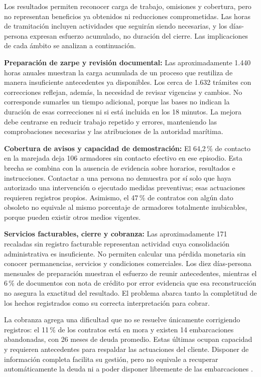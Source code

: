 Los resultados permiten reconocer carga de trabajo, omisiones y cobertura, pero no representan beneficios ya obtenidos ni reducciones comprometidas. Las horas de tramitación incluyen actividades que seguirán siendo necesarias, y los días-persona expresan esfuerzo acumulado, no duración del cierre. Las implicaciones de cada ámbito se analizan a continuación.

\textbf{Preparación de zarpe y revisión documental:}
Las aproximadamente 1.440 horas anuales muestran la carga acumulada de un proceso que reutiliza de manera insuficiente antecedentes ya disponibles. Los cerca de 1.632 trámites con correcciones reflejan, además, la necesidad de revisar vigencias y cambios. No corresponde sumarles un tiempo adicional, porque las bases no indican la duración de esas correcciones ni si está incluida en los 18 minutos. La mejora debe centrarse en reducir trabajo repetido y errores, manteniendo las comprobaciones necesarias y las atribuciones de la autoridad marítima.

\textbf{Cobertura de avisos y capacidad de demostración:} El 64,2\,\% de contacto en la marejada deja 106 armadores sin contacto efectivo en ese episodio. Esta brecha se combina con la ausencia de evidencia sobre horarios, resultados e instrucciones. Contactar a una persona no demuestra por sí solo que haya autorizado una intervención o ejecutado medidas preventivas; esas actuaciones requieren registros propios. Asimismo, el 47\,\% de contratos con algún dato obsoleto no equivale al mismo porcentaje de armadores totalmente inubicables, porque pueden existir otros medios vigentes.

\textbf{Servicios facturables, cierre y cobranza:} Las aproximadamente 171 recaladas sin registro facturable representan actividad cuya consolidación administrativa es insuficiente. No permiten calcular una pérdida monetaria sin conocer permanencias, servicios y condiciones comerciales. Los diez días-persona mensuales de preparación muestran el esfuerzo de reunir antecedentes, mientras el 6\,\% de documentos con nota de crédito por error evidencia que esa reconstrucción no asegura la exactitud del resultado. El problema abarca tanto la completitud de los hechos registrados como su correcta interpretación para cobrar.

La cobranza agrega una dificultad que no se resuelve únicamente corrigiendo registros: el 11\,\% de los contratos está en mora y existen 14 embarcaciones abandonadas, con 26 meses de deuda promedio. Estas últimas ocupan capacidad y requieren antecedentes para respaldar las actuaciones del cliente. Disponer de información completa facilita su gestión, pero no equivale a recuperar automáticamente la deuda ni a poder disponer libremente de las embarcaciones \parencite[cap.~4, secc.~4.11, p.~13]{pucv-caso07-2026}.

